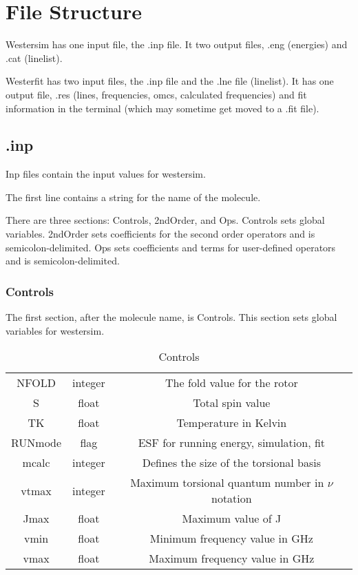 \documentclass{article}
\begin{document}
\let\centering\relax
	
\section{File Structure}

Westersim has one input file, the .inp file. It two output files, .eng (energies) and .cat (linelist).

Westerfit has two input files, the .inp file and the .lne file (linelist). It has one output file, .res (lines, frequencies, omcs, calculated frequencies) and fit information in the terminal (which may sometime get moved to a .fit file).

\subsection{.inp}

Inp files contain the input values for westersim.

The first line contains a string for the name of the molecule.

There are three sections: Controls, 2ndOrder, and Ops. Controls sets global variables. 2ndOrder sets coefficients for the second order operators and is semicolon-delimited. Ops sets coefficients and terms for user-defined operators and is semicolon-delimited.

\subsubsection{Controls}

The first section, after the molecule name, is Controls. This section sets global variables for westersim.

\begin{table}[h]
	\caption{Controls}
\begin{tabular}{c c c}
	\hline
	NFOLD & integer & The fold value for the rotor \\
	S & float & Total spin value \\
	TK & float & Temperature in Kelvin \\
	RUNmode & flag & ESF for running energy, simulation, fit \\
	mcalc & integer & Defines the size of the torsional basis \\
	vtmax & integer & Maximum torsional quantum number in $\nu$ notation \\
	Jmax & float & Maximum value of J \\
	vmin & float & Minimum frequency value in GHz \\
	vmax & float & Maximum frequency value in GHz \\
\end{tabular}
\end{table}
\end{document}
